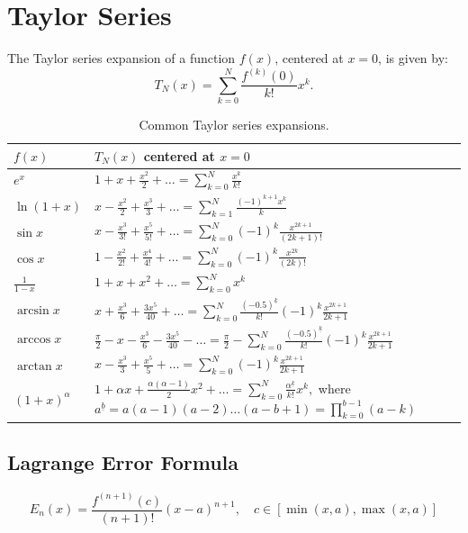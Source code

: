 \documentclass{article}
\begin{document}
\section{Taylor Series}

The Taylor series expansion of a function \(f(x)\), centered at \(x = 0\), is given by:
\[
T_N(x) = \sum_{k=0}^N \frac{f^{(k)}(0)}{k!}x^k.
\]

\begin{table}[!h]
\renewcommand{\arraystretch}{1.5}
\centering
\begin{tabular}{|p{}|p{}|}
\hline 
\textbf{\(f(x)\)} & \textbf{\(T_N(x)\)} centered at \(x=0\) \\
\hline 
\(\displaystyle e^x\) & \(\displaystyle 1 + x + \frac{x^2}{2} + \dots = \sum_{k=0}^N \frac{x^k}{k!}\) \\
\hline 
\(\displaystyle \ln(1+x)\) & \(\displaystyle x - \frac{x^2}{2} + \frac{x^3}{3} + \dots = \sum_{k=1}^N \frac{(-1)^{k+1} x^k}{k}\) \\
\hline 
\(\displaystyle \sin x\) & \(\displaystyle x - \frac{x^3}{3!} + \frac{x^5}{5!} + \dots = \sum_{k=0}^N (-1)^k \frac{x^{2k+1}}{(2k+1)!}\) \\
\hline 
\(\displaystyle \cos x\) & \(\displaystyle 1 - \frac{x^2}{2!} + \frac{x^4}{4!} + \dots = \sum_{k=0}^N (-1)^k \frac{x^{2k}}{(2k)!}\) \\
\hline 
\(\displaystyle \frac{1}{1-x}\) & \(\displaystyle 1 + x + x^2 + \dots = \sum_{k=0}^N x^k\) \\
\hline 
\(\displaystyle \arcsin x\) & \(\displaystyle x + \frac{x^3}{6} + \frac{3x^5}{40} + \dots = \sum_{k=0}^N \frac{(-0.5)^{\underline{k}}}{k!}(-1)^k \frac{x^{2k+1}}{2k+1}\) \\
\hline 
\(\displaystyle \arccos x\) & \(\displaystyle \frac{\pi}{2} - x - \frac{x^3}{6} - \frac{3x^5}{40} - \dots = \frac{\pi}{2} - \sum_{k=0}^N \frac{(-0.5)^{\underline{k}}}{k!}(-1)^k \frac{x^{2k+1}}{2k+1}\) \\
\hline 
\(\displaystyle \arctan x\) & \(\displaystyle x - \frac{x^3}{3} + \frac{x^5}{5} + \dots = \sum_{k=0}^N (-1)^k \frac{x^{2k+1}}{2k+1}\) \\
\hline 
\(\displaystyle (1+x)^\alpha\) & \(\displaystyle 1 + \alpha x + \frac{\alpha (\alpha-1)}{2}x^2 + \dots = \sum_{k=0}^N \frac{\alpha^{\underline{k}}}{k!}x^k,\)
where \(\displaystyle a^{\underline{b}} = a(a-1)(a-2)\dots(a-b+1) = \prod_{k=0}^{b-1} (a-k)\) \\
\hline
\end{tabular}
\caption{Common Taylor series expansions.}
\end{table}

\subsection{Lagrange Error Formula}

\[
E_n(x) = \frac{f^{(n+1)}(c)}{(n+1)!}(x-a)^{n+1}, \quad c \in [\min(x, a), \max(x, a)]
\]

\printbibliography
\end{document}
